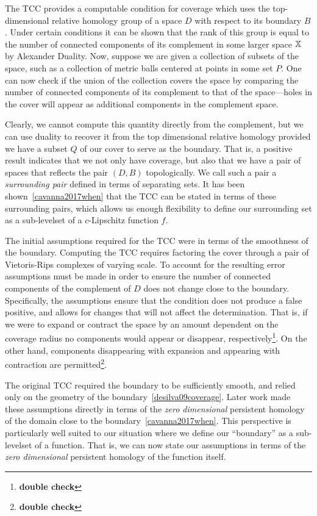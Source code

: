 The TCC provides a computable condition for coverage which uses the top-dimensional relative homology group of a space $D$ with respect to its boundary $B$.
Under certain conditions it can be shown that the rank of this group is equal to the number of connected components of its complement in some larger space $\mathbb{X}$ by Alexander Duality.
Now, suppose we are given a collection of subsets of the space, such as a collection of metric balls centered at points in some set $P$.
One can now check if the union of the collection covers the space by comparing the number of connected components of its complement to that of the space---holes in the cover will appear as additional components in the complement space.

Clearly, we cannot compute this quantity directly from the complement, but we can use duality to recover it from the top dimensional relative homology provided we have a subset $Q$ of our cover to serve as the boundary.
That is, a positive result indicates that we not only have coverage, but also that we have a pair of spaces that reflects the pair $(D, B)$ topologically.
We call such a pair a \emph{surrounding pair} defined in terms of separating sets.
It has been shown~\ref{cavanna2017when} that the TCC can be stated in terms of these surrounding pairs, which allows us enough flexibility to define our surrounding set as a sub-levelset of a $c$-Lipschitz function $f$.

The initial assumptions required for the TCC were in terms of the smoothness of the boundary.
Computing the TCC requires factoring the cover through a pair of Vietoris-Rips complexes of varying scale.
To account for the resulting error assumptions must be made in order to ensure the number of connected components of the complement of $D$ does not change close to the boundary.
Specifically, the assumptions ensure that the condition does not produce a false positive, and allows for changes that will not affect the determination.
That is, if we were to expand or contract the space by an amount dependent on the coverage radius no components would appear or disappear, respectively\footnote{\textbf{double check}}.
On the other hand, components disappearing with expansion and appearing with contraction are permitted\footnote{\textbf{double check}}.

The original TCC required the boundary to be sufficiently smooth, and relied only on the geometry of the boundary~\ref{desilva09coverage}.
Later work made these assumptions directly in terms of the \emph{zero dimensional} persistent homology of the domain close to the boundary~\ref{cavanna2017when}.
This perspective is particularly well suited to our situation where we define our ``boundary'' as a sub-levelset of a function.
That is, we can now state our assumptions in terms of the \emph{zero dimensional} persistent homology of the function itself.

